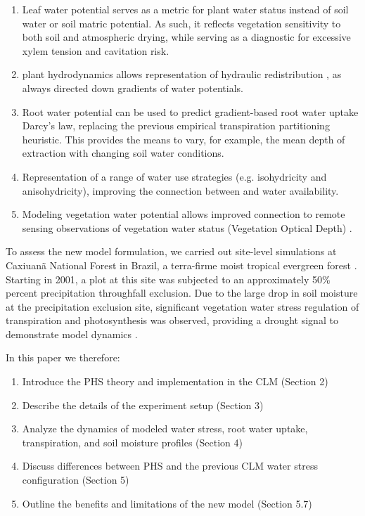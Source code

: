\documentclass[draft,linenumbers]{agujournal}
\begin{document}
\begin{enumerate}
\item Leaf water potential serves as a metric for plant water status instead of soil water or soil matric potential. As such, it reflects vegetation sensitivity to both soil and atmospheric drying, while serving as a diagnostic for excessive xylem tension and cavitation risk. 
\item {} plant hydrodynamics allows representation of hydraulic redistribution \citep{lee2005}, as  always directed down gradients of water potentials. 
\item Root water potential can be used to predict gradient-based root water uptake  Darcy's law, replacing the previous empirical transpiration partitioning heuristic. This provides the means to vary, for example, the mean depth of extraction with changing soil water conditions.
\item Representation of a range of water use strategies (e.g. isohydricity and anisohydricity), improving the connection between  and water availability.
\item Modeling vegetation water potential allows improved connection to remote sensing observations of vegetation water status (Vegetation Optical Depth) \citep{konings2016}. 
\end{enumerate}

To assess the new model formulation, we carried out site-level simulations at Caxiuan\~a National Forest in Brazil, a terra-firme moist tropical evergreen forest \citep{fisher2006}. Starting in 2001, a plot at this site was subjected to an approximately 50\% percent precipitation throughfall exclusion. Due to the large drop in soil moisture at the precipitation exclusion site, significant vegetation water stress regulation of transpiration and photosynthesis was observed\citep{dacosta2010,dacosta2013}, providing a drought signal to demonstrate model dynamics \citep{fisher2007}.

In this paper we therefore:
\begin{enumerate}
\item Introduce the PHS theory and implementation in the CLM (Section 2)
\item Describe the details of the experiment setup (Section 3)
\item Analyze the dynamics of modeled water stress, root water uptake, transpiration, and soil moisture profiles (Section 4)
\item Discuss differences between PHS and the previous CLM water stress configuration (Section 5)
\item Outline the benefits and limitations of the new model (Section 5.7)
\end{enumerate}
\end{document}
